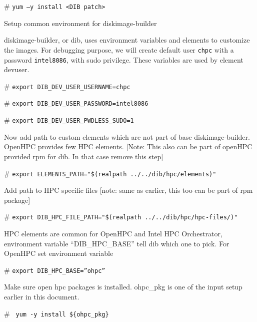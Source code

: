 \begin{section}
{\begin{bash}[ctrlr]\# \texttt{\small{yum –y install <DIB patch>}}\end{bash}

Setup common environment for diskimage-builder

diskimage-builder, or dib, uses environment variables and elements to customize the images. For debugging purpose, we will create default user \texttt{chpc} with a password \texttt{intel8086}, with sudo privilege. These variables are used by element devuser. 

\begin{bash}[ctrlr]\# \texttt{\small{export DIB\_DEV\_USER\_USERNAME=chpc}}\end{bash}
\begin{bash}[ctrlr]\# \texttt{\small{export DIB\_DEV\_USER\_PASSWORD=intel8086}}\end{bash}
\begin{bash}[ctrlr]\# \texttt{\small{export DIB\_DEV\_USER\_PWDLESS\_SUDO=1}}\end{bash}

Now add path to custom elements which are not part of base diskimage-builder. OpenHPC provides few HPC elements. [Note: This also can be part of openHPC provided rpm for dib. In that case remove this step]

\begin{bash}[ctrlr]\# \texttt{\small{export ELEMENTS\_PATH="\$(realpath ../../dib/hpc/elements)"}}\end{bash}

Add path to HPC specific files [note: same as earlier, this too can be part of rpm package]

\begin{bash}[ctrlr]\# \texttt{\small{export DIB\_HPC\_FILE\_PATH="\$(realpath ../../dib/hpc/hpc-files/)"}}\end{bash}

HPC elements are common for OpenHPC and Intel HPC Orchestrator, environment variable “DIB\_HPC\_BASE” tell dib which one to pick. For OpenHPC set environment variable

\begin{bash}[ctrlr]\# \texttt{\small{export DIB\_HPC\_BASE=”ohpc”}}\end{bash}

Make sure open hpc packages is installed. ohpc\_pkg is one of the input setup earlier in this document.

\begin{bash}[ctrlr]\# \texttt{\small{ yum -y install \$\{ohpc\_pkg\}}}\end{bash}

}
\end{section}

